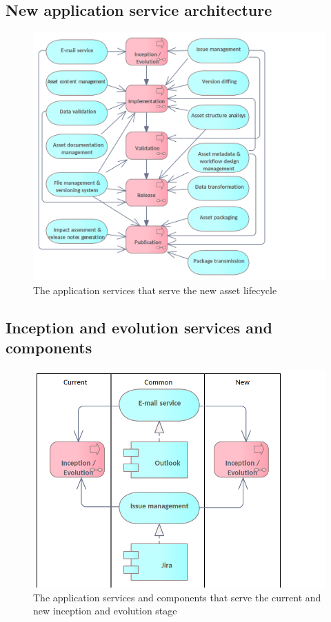 	\subsection{New application service architecture}
	\label{sec:application-new}	

	\begin{figure}[h]
		\centering
		\includegraphics[width=.9\textwidth]{images/application/Application Services (new).png}
		\caption{The application services that serve the new asset lifecycle}
		\label{fig:application-new}
	\end{figure}	
	
	\subsection{Inception and evolution services and components}
	\label{sec:evolution-application}	
	\begin{figure}[h]
		\centering
		\includegraphics[width=.6\textwidth]{images/application/InceptionEvolution.png}
		\caption{The application services and components that serve the current and new inception and evolution stage}
		\label{fig:application-inception-evolution}
	\end{figure}

